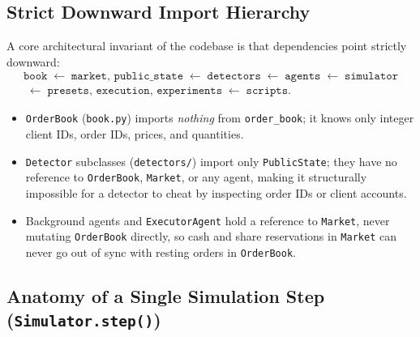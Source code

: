\documentclass[11pt,a4paper]{article}
\newcommand{\code}[1]{\texttt{#1}}
\begin{document}
\subsection{Strict Downward Import Hierarchy}

A core architectural invariant of the codebase is that dependencies point strictly downward:
\begin{align*}
  \code{book}
  \;\longleftarrow\;
  \code{market},\, \code{public\_state}
  \;\longleftarrow\;
  \code{detectors}
  \;\longleftarrow\;
  \code{agents}
  \;\longleftarrow\;
  \code{simulator} \\
  \;\longleftarrow\;
  \code{presets},\, \code{execution},\, \code{experiments}
  \;\longleftarrow\;
  \code{scripts}.
\end{align*}
\begin{itemize}[nosep]
\item \code{OrderBook} (\code{book.py}) imports \emph{nothing} from \code{order\_book}; it knows only
  integer client IDs, order IDs, prices, and quantities.
\item \code{Detector} subclasses (\code{detectors/}) import only \code{PublicState}; they have no
  reference to \code{OrderBook}, \code{Market}, or any agent, making it structurally impossible for a
  detector to cheat by inspecting order IDs or client accounts.
\item Background agents and \code{ExecutorAgent} hold a reference to \code{Market}, never mutating
  \code{OrderBook} directly, so cash and share reservations in \code{Market} can never go out of sync
  with resting orders in \code{OrderBook}.
\end{itemize}

\subsection{Anatomy of a Single Simulation Step (\code{Simulator.step()})}
\end{document}
